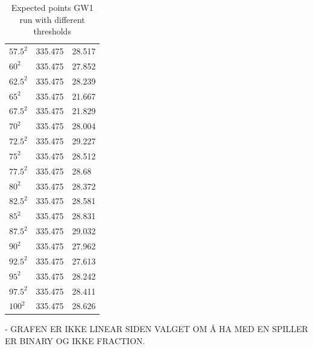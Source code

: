 \begin{table}[H]
\begin{tabular}{@{}lll@{}}
$57.5^2$   & 335.475             & 28.517                       \\
$60^2$     & 335.475             & 27.852                       \\
$62.5^2$   & 335.475             & 28.239                       \\
$65^2$     & 335.475             & 21.667                       \\
$67.5^2$   & 335.475             & 21.829                       \\
$70^2$     & 335.475             & 28.004                       \\
$72.5^2$   & 335.475             & 29.227                       \\
$75^2$     & 335.475             & 28.512                       \\
$77.5^2$   & 335.475             & 28.68                        \\
$80^2$     & 335.475             & 28.372                       \\
$82.5^2$   & 335.475             & 28.581                       \\
$85^2$     & 335.475             & 28.831                       \\
$87.5^2$   & 335.475             & 29.032                       \\
$90^2$     & 335.475             & 27.962                       \\
$92.5^2$   & 335.475             & 27.613                       \\
$95^2$     & 335.475             & 28.242                       \\
$97.5^2$   & 335.475             & 28.411                       \\
$100^2$    & 335.475             & 28.626                       \\ \bottomrule
\end{tabular}
\caption{Expected points GW1 run with different thresholds}
\label{tab: threshold_expected_points_gw1}
\end{table}

- GRAFEN ER IKKE LINEAR SIDEN VALGET OM Å HA MED EN SPILLER ER BINARY OG IKKE FRACTION. 

